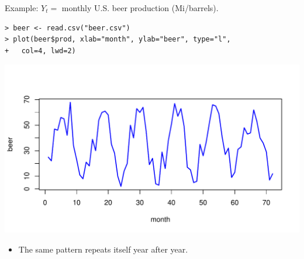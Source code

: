 \documentclass[12pt,xcolor=svgnames]{beamer}
\newcommand{\bl}{\color{blue}}
\newcommand{\nochap}{\vspace{0.5cm}}
\newcommand{\nsk}{\vspace{-.4cm}}
\begin{document}
\begin{frame}[fragile]
\nochap

{\bl Example:} $Y_t = $ monthly U.S. beer production (Mi/barrels).

{\bl \footnotesize
\begin{verbatim}
> beer <- read.csv("beer.csv")
> plot(beer$prod, xlab="month", ylab="beer", type="l", 
+   col=4, lwd=2)
\end{verbatim}
}

\begin{center}
\includegraphics[scale=0.58,trim=10 20 0 55]{beer_new}
\end{center}

\nsk
\begin{itemize}
\item The same pattern repeats itself year after year.
\end{itemize}

\end{frame}
\end{document}

